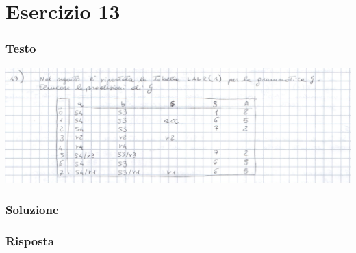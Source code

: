 \chapter{Esercizio 13}

\subsection{Testo}

\begin{center}
    \includegraphics[scale=0.2]{Chapters/Img/13text.png}\\
\end{center} 

\subsection{Soluzione}

\subsection{Risposta}